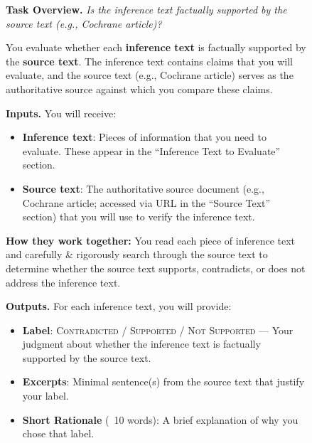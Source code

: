 \documentclass{article}
\begin{document}
\clearpage

\begin{figure}[t]
\centering
\begin{small}
\begin{tcolorbox}[colback=gray!5, colframe=black, width=\textwidth, title=\textbf{Annotation Guideline for Evaluating Factual Precision}, fonttitle=\bfseries]

\textbf{Task Overview.} \textit{Is the inference text factually supported by the source text (e.g., Cochrane article)?}\vspace{0.5em}


You evaluate whether each \textbf{inference text} is factually supported by the \textbf{source text}. The inference text contains claims that you will evaluate, and the source text (e.g., Cochrane article) serves as the authoritative source against which you compare these claims.\vspace{0.5em}

\vspace{0.5em}
\textbf{Inputs.}
You will receive:
\begin{itemize}[leftmargin=0.6cm]
    \item \textbf{Inference text}: Pieces of information that you need to evaluate. These appear in the ``Inference Text to Evaluate'' section.
    \item \textbf{Source text}: The authoritative source document (e.g., Cochrane article; accessed via URL in the ``Source Text'' section) that you will use to verify the inference text.
\end{itemize}
\textbf{How they work together:} You read each piece of inference text and carefully \& rigorously search through the source text to determine whether the source text supports, contradicts, or does not address the inference text.


\vspace{0.5em}
\textbf{Outputs.}
For each inference text, you will provide:
\begin{itemize}[leftmargin=0.6cm]
    \item \textbf{Label}: \textsc{Contradicted} / \textsc{Supported} / \textsc{Not Supported} --- Your judgment about whether the inference text is factually supported by the source text.
    \item \textbf{Excerpts}: Minimal sentence(s) from the source text that justify your label.
    \item \textbf{Short Rationale} (~10 words): A brief explanation of why you chose that label.
\end{itemize}


\end{tcolorbox}
\end{small}
\end{figure}
\end{document}
